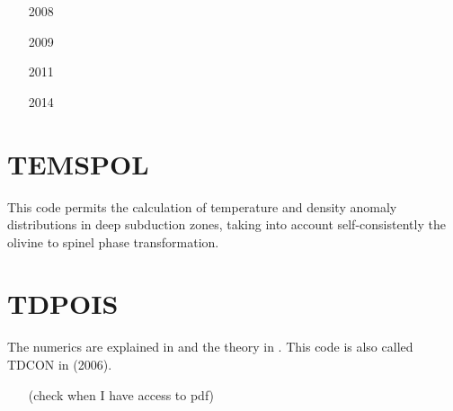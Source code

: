\begin{small}
\begin{itemize}
\item[2008]
\textcite{vanv08}
\item[2009]
\textcite{vale09}
\item[2011]
\textcite{vanj11}
\item[2014]
\textcite{vanb14}
\end{itemize}
\end{small}

\section{TEMSPOL} 
This code permits the calculation of temperature and density anomaly 
distributions in deep subduction zones, taking into account self-consistently 
the olivine to spinel phase transformation.

\begin{small}
\begin{itemize}
\item[\twothousandfour]  
\textcite{nevc04}
\item[\twothousandfive]  
\textcite{canv05}
\item[\twothousandfourteen]  
\textcite{duqo14}
\end{itemize}
\end{small}

\section{TDPOIS} 

The numerics are explained in \cite{hous87} and the theory in \cite{hous90}.
This code is also called TDCON in \textcite{cosc06} (2006).

\begin{small}
\begin{itemize}
\item[\nineteeneightyseven]\textcite{hous87}
\item[\nineteenninety] \textcite{hous90} \textcite{hous90b}
\item[\nineteenninetyfive] \textcite{schh95} (check when I have access to pdf)
\item[\nineteenninetysix] \textcite{schh96}
\item[\twothousandtwo] \textcite{scbh02}
\item[\twothousandfour] \textcite{scbh04}
\item[\twothousandsix] \textcite{cosc06}
\end{itemize}
\end{small}

